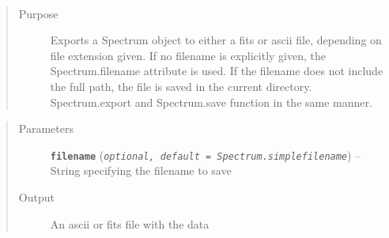 \documentclass[letterpaper,10pt,english]{sphinxmanual}
\begin{document}
\begin{fulllineitems}
\begin{fulllineitems}
\label{api:splat.Spectrum.export}~\begin{quote}\begin{description}
\item[{Purpose}] \leavevmode
Exports a Spectrum object to either a fits or ascii file, depending on file extension given.  If no filename is explicitly given, the Spectrum.filename attribute is used. If the filename does not include the full path, the file is saved in the current directory.  Spectrum.export and Spectrum.save function in the same manner.

\end{description}\end{quote}
\begin{quote}\begin{description}
\item[{Parameters}] \leavevmode
\textbf{\texttt{filename}} (\emph{\texttt{optional, default = Spectrum.simplefilename}}) -- String specifying the filename to save

\item[{Output}] \leavevmode
An ascii or fits file with the data


\end{description}
\end{quote}
\end{fulllineitems}
\end{fulllineitems}
\end{document}
